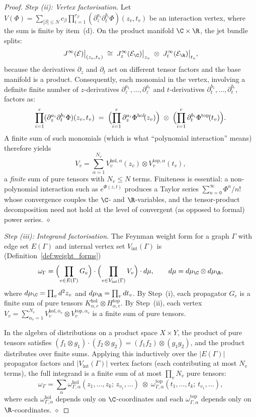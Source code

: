 \begin{proof}
\medskip
\emph{Step (ii): Vertex factorisation.}
Let $V(\Phi) = \sum_{|\beta| \le N} c_\beta \prod_{i=1}^{r_\beta} (\partial_z^{a_i} \partial_t^{b_i} \Phi)(z_v, t_v)$ be an interaction vertex, where the sum is finite by item~(d). On the product manifold $\C \times \R$, the jet bundle splits:
\[
 J^\infty(\mathcal{E})\big|_{(z_v, t_v)}
 \;\cong\;
 J^\infty_z(\mathcal{E}_\C)\big|_{z_v}
 \;\otimes\;
 J^\infty_t(\mathcal{E}_\R)\big|_{t_v},
\]
because the derivatives $\partial_z$ and $\partial_t$ act on different tensor factors and the base manifold is a product. Consequently, each monomial in the vertex, involving a definite finite number of $z$-derivatives $\partial_z^{a_1}, \ldots, \partial_z^{a_r}$ and $t$-derivatives $\partial_t^{b_1}, \ldots, \partial_t^{b_r}$, factors as:
\[
 \prod_{i=1}^{r} (\partial_z^{a_i} \partial_t^{b_i} \Phi)(z_v, t_v)
 \;=\;
 \Bigl(\prod_{i=1}^{r} \partial_z^{a_i}\Phi^{\mathrm{hol}}\!(z_v)\Bigr)
 \;\otimes\;
 \Bigl(\prod_{i=1}^{r} \partial_t^{b_i}\Phi^{\mathrm{top}}\!(t_v)\Bigr).
\]
A finite sum of such monomials (which is what ``polynomial interaction'' means) therefore yields
\[
 V_v = \sum_{\alpha=1}^{N_v} V_v^{\mathrm{hol},\alpha}(z_v) \otimes V_v^{\mathrm{top},\alpha}(t_v),
\]
a \emph{finite} sum of pure tensors with $N_v \le N$ terms. Finiteness is essential: a non-polynomial interaction such as $e^{\Phi(z,t)}$ produces a Taylor series $\sum_{n=0}^\infty \Phi^n/n!$ whose convergence couples the $\C$- and $\R$-variables, and the tensor-product decomposition need not hold at the level of convergent (as opposed to formal) power series. \hfill$\diamond$

\medskip
\emph{Step (iii): Integrand factorisation.}
The Feynman weight form for a graph $\Gamma$ with edge set $E(\Gamma)$ and internal vertex set $V_{\mathrm{int}}(\Gamma)$ is (Definition~\ref{def:weight_forms})
\[
 \omega_\Gamma
 = \Bigl(\prod_{e \in E(\Gamma)} G_e\Bigr)
 \cdot
 \Bigl(\prod_{v \in V_{\mathrm{int}}(\Gamma)} V_v\Bigr)
 \cdot d\mu,
 \qquad
 d\mu = d\mu_\C \otimes d\mu_\R,
\]
where $d\mu_\C = \prod_{v} d^2 z_v$ and $d\mu_\R = \prod_{v} dt_v$. By Step~(i), each propagator $G_e$ is a finite sum of pure tensors $K_{\alpha,e}^{\mathrm{hol}}\otimes H_{\alpha,e}^{\mathrm{top}}$. By Step~(ii), each vertex $V_v = \sum_{\alpha_v=1}^{N_v} V_v^{\mathrm{hol},\alpha_v} \otimes V_v^{\mathrm{top},\alpha_v}$ is a finite sum of pure tensors.

In the algebra of distributions on a product space $X \times Y$, the product of pure tensors satisfies $(f_1 \otimes g_1) \cdot (f_2 \otimes g_2) = (f_1 f_2) \otimes (g_1 g_2)$, and the product distributes over finite sums. Applying this inductively over the $|E(\Gamma)|$ propagator factors and $|V_{\mathrm{int}}(\Gamma)|$ vertex factors (each contributing at most $N_v$ terms), the full integrand is a finite sum of at most $\prod_v N_v$ pure tensors:
\[
 \omega_\Gamma
 = \sum_{\alpha}
 \omega_{\Gamma,\alpha}^{\mathrm{hol}}(z_1,\ldots,z_k;\, z_{v_1},\ldots)
 \;\otimes\;
 \omega_{\Gamma,\alpha}^{\mathrm{top}}(t_1,\ldots,t_k;\, t_{v_1},\ldots),
\]
where each $\omega_{\Gamma,\alpha}^{\mathrm{hol}}$ depends only on $\C$-coordinates and each $\omega_{\Gamma,\alpha}^{\mathrm{top}}$ depends only on $\R$-coordinates. \hfill$\diamond$


\end{proof}
